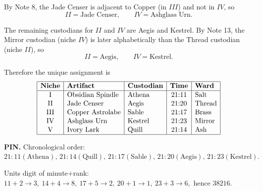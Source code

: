 By Note 8, the Jade Censer is adjacent to Copper (in \(III\)) and not in \(IV\), so
\[
II=\text{Jade Censer},\qquad IV=\text{Ashglass Urn}.
\]

The remaining custodians for \(II\) and \(IV\) are Aegis and Kestrel. By Note 13, the Mirror custodian (niche \(IV\)) is later alphabetically than the Thread custodian (niche \(II\)), so
\[
II=\text{Aegis},\qquad IV=\text{Kestrel}.
\]

Therefore the unique assignment is
\[
\renewcommand{\arraystretch}{1.05}
\begin{array}{|c|l|l|c|l|}
\hline
\textbf{Niche} & \textbf{Artifact} & \textbf{Custodian} & \textbf{Time} & \textbf{Ward}\\
\hline
\text{I}   & \text{Obsidian Spindle} & \text{Athena}  & 21{:}11 & \text{Salt}\\
\text{II}  & \text{Jade Censer}      & \text{Aegis}   & 21{:}20 & \text{Thread}\\
\text{III} & \text{Copper Astrolabe} & \text{Sable}   & 21{:}17 & \text{Brass}\\
\text{IV}  & \text{Ashglass Urn}     & \text{Kestrel} & 21{:}23 & \text{Mirror}\\
\text{V}   & \text{Ivory Lark}       & \text{Quill}   & 21{:}14 & \text{Ash}\\
\hline
\end{array}
\]

\medskip

\noindent\textbf{PIN.}
Chronological order:
$21{:}11(\text{Athena}),\,21{:}14(\text{Quill}),\,21{:}17(\text{Sable}),\,21{:}20(\text{Aegis}),\,21{:}23(\text{Kestrel}).$

Units digit of minute$+$rank:
$11{+}2\to3,\ 14{+}4\to8,\ 17{+}5\to2,\ 20{+}1\to1,\ 23{+}3\to6,$
hence $\boxed{38216}$.




\NextPage
